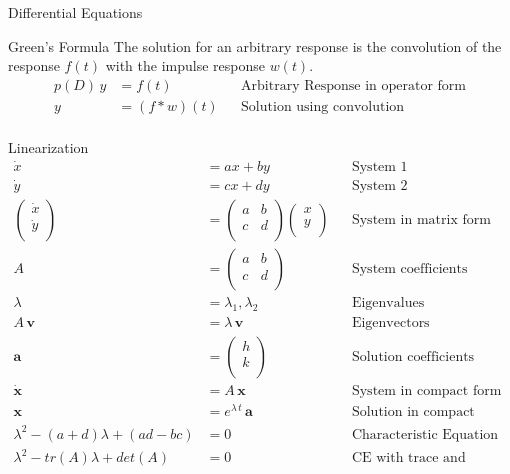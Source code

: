 \begin{section}{Differential Equations}
  \begin{subsection}{Green's Formula}
    The solution for an arbitrary response is the convolution of the response
    $f(t)$ with the impulse response $w(t)$.
    \begin{align*}
      p(D)\,y &= f(t) && \text{Arbitrary Response in operator form} \\
      y &= (f \ast w)(t) && \text{Solution using convolution} \\
    \end{align*}
  \end{subsection}

  \begin{subsection}{Linearization}
    \begin{align*}
      \dot{x} &= ax + by && \text{System 1}\\
      \dot{y} &= cx + dy && \text{System 2}\\
      \begin{pmatrix}
        \dot{x} \\
        \dot{y} \\
      \end{pmatrix}
      &=
      \begin{pmatrix}
        a & b \\
        c & d \\
      \end{pmatrix}
      \begin{pmatrix}
        x \\
        y \\
      \end{pmatrix}
      && \text{System in matrix form}\\
      A &=
      \begin{pmatrix}
        a & b \\
        c & d \\
      \end{pmatrix}
      && \text{System coefficients}\\
      \lambda &= \lambda_1 , \lambda_2 && \text{Eigenvalues}\\
      A\,\mathbf{v} &= \lambda\,\mathbf{v} &&  \text{Eigenvectors}\\
      \mathbf{a} &=
      \begin{pmatrix}
        h \\
        k \\
      \end{pmatrix}
      && \text{Solution coefficients}\\
     \dot{\mathbf{x}} &= A\,\mathbf{x} && \text{System in compact form} \\
     \mathbf{x} &= e^{\lambda\,t}\,\mathbf{a}
     && \text{Solution in compact form} \\
     \lambda^2 - (a+d)\lambda + (ad - bc) &= 0
     && \text{Characteristic Equation (CE)} \\
     \lambda^2 - tr(A)\lambda + det(A) &= 0
     && \text{CE with trace and determinant} \\
    \end{align*}
  \end{subsection}
\end{section}
